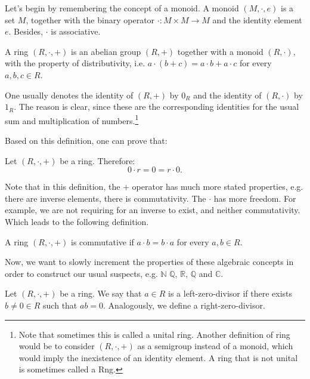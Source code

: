 Let's begin by remembering the concept of a monoid. A monoid $(M, \cdot, e)$
is a set $M$, together with the binary operator $\cdot: M \times M \to M$ and the identity
element $e$. Besides, $\cdot$ is associative.

\begin{definition}[Ring]
    A ring $(R, \cdot, +)$ is an abelian group $(R,+)$ together with a monoid $(R, \cdot)$,
    with the property of distributivity, i.e. $a \cdot (b + c) = a\cdot b + a \cdot c$ for every
    $a,b,c \in R$.

    One usually denotes the identity of $(R,+)$ by $0_R$ and the identity of $(R, \cdot)$
    by $1_R$. The reason is clear, since these are the corresponding identities
    for the usual sum and multiplication of numbers.\footnote{Note that sometimes this is called
    a unital ring. Another definition of ring would be to consider $(R, \cdot,+)$ as a semigroup
instead of a monoid, which would imply the inexistence of an identity element.
A ring that is not unital is sometimes called a Rng.}
\end{definition}

Based on this definition, one can prove that:
\begin{proposition}
    Let $(R, \cdot, +)$ be a ring. Therefore:
    \begin{displaymath}
        0 \cdot r = 0 = r \cdot 0.
    \end{displaymath}
\end{proposition}

Note that in this definition, the $+$ operator has much more stated properties, e.g.
there are inverse elements, there is commutativity. The $\cdot$ has more freedom.
For example, we are not requiring for an inverse to exist, and neither commutativity.
Which leads to the following definition.

\begin{definition}
	A ring $(R, \cdot, +)$ is commutative if $a \cdot b = b \cdot a$ for every $a,b \in R$.
\end{definition}

Now, we want to slowly increment the properties of these algebraic concepts in order
to construct our usual suspects, e.g. $\mathbb N$ $\mathbb Q$, $\mathbb R$, $\mathbb Q$ and $\mathbb C$.

\begin{definition}
	Let $(R,\cdot, +)$ be a ring. We say that $a \in R$ is a left-zero-divisor
	if there exists $b \neq 0 \in R$ such that $a b = 0$. Analogously, we define
	a right-zero-divisor.
\end{definition}

